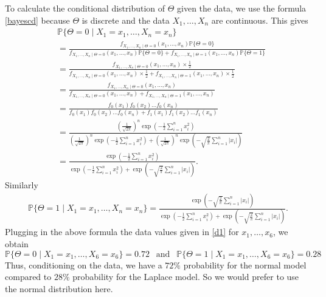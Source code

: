 \documentclass{scrartcl}
\renewcommand{\P}{{\mathbb P}}
\begin{document}
To calculate the conditional distribution of $\Theta$ given the data,
we use the formula \eqref{bayescd} because $\Theta$ is discrete and
the data $X_1, \dots, X_n$ are continuous. This gives
\begin{align*}
    &\P\{\Theta = 0 \mid X_1 = x_1, \dots, X_n = x_n\} \\ &= \frac{f_{X_1,
    \dots, X_n \mid
    \Theta = 0}(x_1,
    \dots, x_n)
    \P\{\Theta = 0\}}{f_{X_1,
    \dots, X_n\mid
    \Theta= 0}(x_1,
    \dots, x_n)
    \P\{\Theta = 0\}
    + f_{X_1,
    \dots, X_n \mid
    \Theta = 1}(x_1,
    \dots, x_n)
    \P\{\Theta =
    1\}} \\
    &= \frac{f_{X_1,
    \dots, X_n \mid
    \Theta = 0}(x_1,
    \dots, x_n)
    \times \frac{1}{2}
    }{f_{X_1,
    \dots, X_n\mid
    \Theta= 0}(x_1,
    \dots, x_n) \times
    \frac{1}{2}
    + f_{X_1,
    \dots, X_n \mid
    \Theta = 1}(x_1,
    \dots, x_n)
    \times \frac{1}{2}
    } \\
    &= \frac{f_{X_1,
    \dots, X_n \mid
    \Theta = 0}(x_1,
    \dots, x_n)
    }{f_{X_1,
    \dots, X_n\mid
    \Theta= 0}(x_1,
    \dots, x_n)  + f_{X_1,
    \dots, X_n \mid
    \Theta = 1}(x_1,
    \dots, x_n)} \\
    &= \frac{f_0(x_1) f_0(x_2) \dots f_0(x_n)}{f_0(x_1) f_0(x_2) \dots
    f_0(x_n) + f_1(x_1) f_1(x_2) \dots f_1(x_n)} \\
    &= \frac{\left(\frac{1}{\sqrt{2 \pi}} \right)^n \exp
    \left(-\frac{1}{2}
    \sum_{i=1}^n x_i^2 \right)}{\left(\frac{1}{\sqrt{2 \pi}} \right)^n \exp
    \left(-\frac{1}{2}
    \sum_{i=1}^n x_i^2
    \right) + \left(\frac{1}{\sqrt{2 \pi}} \right)^n \exp
    \left(-\sqrt{\frac{2}{\pi}}
    \sum_{i=1}^n |x_i| \right)}
    \\
    &= \frac{ \exp
    \left(-\frac{1}{2}
    \sum_{i=1}^n x_i^2 \right)}{ \exp
    \left(-\frac{1}{2}
    \sum_{i=1}^n x_i^2
    \right) + \exp
    \left(-\sqrt{\frac{2}{\pi}}
    \sum_{i=1}^n |x_i| \right)}.
\end{align*}
Similarly
\begin{align*}
    \P\{\Theta = 1 \mid X_1 = x_1, \dots, X_n = x_n\}
    = \frac{ \exp
    \left(-\sqrt{\frac{2}{\pi}}
    \sum_{i=1}^n |x_i| \right)}{ \exp
    \left(-\frac{1}{2}
    \sum_{i=1}^n x_i^2
    \right) + \exp
    \left(-\sqrt{\frac{2}{\pi}}
    \sum_{i=1}^n |x_i| \right)}.
\end{align*}
Plugging in the above formula the data values given in \eqref{d1} for
$x_1, \dots, x_6$, we obtain
\begin{equation*}
    \P\{\Theta = 0 \mid X_1 = x_1, \dots, X_6 = x_6\}  =  0.72 ~~ \text{ and
    } ~~ \P\{\Theta = 1 \mid X_1 = x_1, \dots, X_6 = x_6\}  = 0.28
\end{equation*}
Thus, conditioning on the data, we have a $72 \%$ probability for the
normal model compared to $28\%$ probability for the Laplace
model. So we would prefer to use the normal distribution here. 
\end{document}
